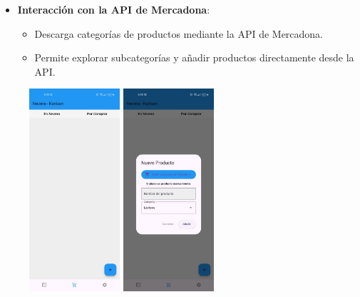 \documentclass{article}
\begin{document}
\begin{flushleft}
\begin{itemize}
    \item \textbf{Interacci\'on con la API de Mercadona}:
    \begin{itemize}
        \item Descarga categor\'ias de productos mediante la API de Mercadona.
        \item Permite explorar subcategor\'ias y a\~nadir productos directamente desde la API.
    \end{itemize}
\end{itemize}

\begin{figure}[H]
    
   \includegraphics[width=0.3\textwidth]{TFG/img/img/nevera1.jpeg}
\includegraphics[width=0.3\textwidth]{TFG/img/img/agregar product.jpeg}

\end{figure}
\end{flushleft}
\end{document}
